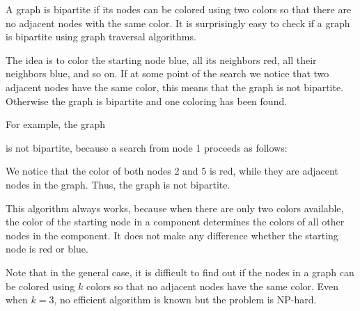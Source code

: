 
A graph is bipartite if its nodes can be colored
using two colors so that there are no adjacent
nodes with the same color.
It is surprisingly easy to check if a graph
is bipartite using graph traversal algorithms.

The idea is to color the starting node blue,
all its neighbors red, all their neighbors blue, and so on.
If at some point of the search we notice that
two adjacent nodes have the same color,
this means that the graph is not bipartite.
Otherwise the graph is bipartite and one coloring
has been found.

For example, the graph
\begin{center}
\end{center}
is not bipartite, because a search from node 1
proceeds as follows:
\begin{center}
\end{center}
We notice that the color of both nodes 2 and 5
is red, while they are adjacent nodes in the graph.
Thus, the graph is not bipartite.

This algorithm always works, because when there
are only two colors available,
the color of the starting node in a component
determines the colors of all other nodes in the component.
It does not make any difference whether the
starting node is red or blue.

Note that in the general case,
it is difficult to find out if the nodes
in a graph can be colored using $k$ colors
so that no adjacent nodes have the same color.
Even when $k=3$, no efficient algorithm is known
but the problem is NP-hard.
